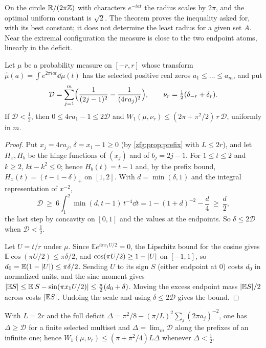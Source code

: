 On the circle $\mathbb{R}/(2\pi\mathbb{Z})$ with characters $e^{-iat}$ the radius scales by $2\pi$, and the optimal uniform constant is $\sqrt2$.
The theorem proves the inequality asked for, with its best constant; it does not determine the least radius for a
given set $A$. Near the extremal configuration the measure is close to the two endpoint atoms, linearly in the
deficit.

\begin{theorem}\label{zfg:thm:stab}
Let $\mu$ be a probability measure on $[-r,r]$ whose transform $\widehat\mu(a)=\int e^{2\pi iat}\dd\mu(t)$ has the selected positive
real zeros $a_1\le\dots\le a_m$, and put
\[
 \mathcal D=\sum_{j=1}^m\Bigl(\frac1{(2j-1)^2}-\frac1{(4ra_j)^2}\Bigr),\qquad \nu_r=\tfrac12(\delta_{-r}+\delta_r).
\]
If $\mathcal D<\tfrac12$, then $0\le4ra_1-1\le2\mathcal D$ and $W_1(\mu,\nu_r)\le(2\pi+\pi^2/2)\,r\,\mathcal D$, uniformly in $m$.
\end{theorem}

\begin{proof}
Put $x_j=4ra_j$, $\delta=x_1-1\ge0$ (by \cref{zfg:prop:prefix} with $L\le2r$), and let $H_x,H_b$ be the hinge functions of
$(x_j)$ and of $b_j=2j-1$. For $1\le t\le2$ and $k\ge2$, $kt-k^2\le0$; hence $H_b(t)=t-1$ and, by the prefix bound,
$H_x(t)=(t-1-\delta)_+$ on $[1,2]$. With $d=\min(\delta,1)$ and the integral representation of $x^{-2}$,
\[
 \mathcal D\ \ge\ 6\int_1^2\min(d,t-1)\,t^{-4}\dd t=1-(1+d)^{-2}-\frac d4\ \ge\ \frac d2,
\]
the last step by concavity on $[0,1]$ and the values at the endpoints. So $\delta\le2\mathcal D$ when $\mathcal D<\tfrac12$.

Let $U=t/r$ under $\mu$. Since $\mathbb Ee^{i\pi x_1U/2}=0$, the Lipschitz bound for the cosine gives $\mathbb E\cos(\pi U/2)\le\pi\delta/2$, and
$\cos(\pi U/2)\ge1-\lvert U\rvert$ on $[-1,1]$, so $d_0=\mathbb E(1-\lvert U\rvert)\le\pi\delta/2$. Sending $U$ to its sign $S$ (either endpoint at $0$) costs
$d_0$ in normalized units, and the sine moment gives
$\lvert\mathbb ES\rvert\le\mathbb E\lvert S-\sin(\pi x_1U/2)\rvert\le\tfrac\pi2(d_0+\delta)$. Moving the excess endpoint mass $\lvert\mathbb ES\rvert/2$ across costs
$\lvert\mathbb ES\rvert$. Undoing the scale and using $\delta\le2\mathcal D$ gives the bound.
\end{proof}

With $L=2r$ and the full deficit $\Delta=\pi^2/8-(\pi/L)^2\sum_j(2\pi a_j)^{-2}$, one has $\Delta\ge\mathcal D$ for a finite selected
multiset and $\Delta=\lim_m\mathcal D$ along the prefixes of an infinite one; hence $W_1(\mu,\nu_r)\le(\pi+\pi^2/4)L\Delta$ whenever
$\Delta<\tfrac12$.

